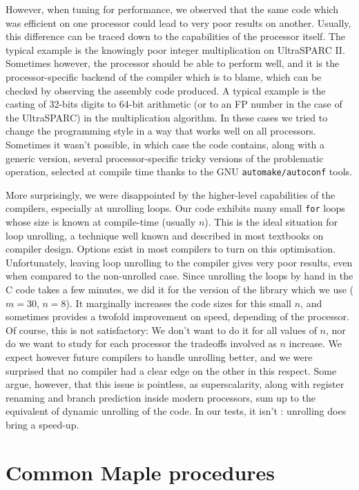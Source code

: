 However, when tuning for performance, we observed that the same code
which was efficient on one processor could lead to very poor results
on another.  Usually, this difference can be traced down to the
capabilities of the processor itself. The typical example is the
knowingly poor integer multiplication on UltraSPARC II. Sometimes
however, the processor should be able to perform well, and it is the
processor-specific backend of the compiler which is to blame, which
can be checked by observing the assembly code produced.  A typical
example is the casting of 32-bits digits to 64-bit arithmetic (or to
an FP number in the case of the UltraSPARC) in the multiplication
algorithm. In these cases we tried to change the programming style in
a way that works well on all processors. Sometimes it wasn't possible,
in which case the code contains, along with a generic version, several
processor-specific tricky versions of the problematic operation,
selected at compile time thanks to the GNU \texttt{automake/autoconf}
tools.


More surprisingly, we were disappointed by the higher-level
capabilities of the compilers, especially at unrolling loops. Our code
exhibits many small \texttt{for} loops whose size is known at
compile-time (usually $n$). This is the ideal situation for loop
unrolling, a technique well known and described in most textbooks on
compiler design. Options exist in most compilers to turn on this
optimisation. Unfortunately, leaving loop unrolling to the compiler
gives very poor results, even when compared to the non-unrolled case.
Since unrolling the loops by hand in the C code takes a few minutes,
we did it for the version of the library which we use ($m=30$, $n=8$).
It marginally increases the code sizes for this small $n$, and
sometimes provides a twofold improvement on speed, depending of the
processor. Of course, this is not satisfactory: We don't want to do it
for all values of $n$, nor do we want to study for each processor the
tradeoffs involved as $n$ increase. We expect however future compilers
to handle unrolling better, and we were surprised that no compiler had
a clear edge on the other in this respect. Some argue, however, that
this issue is pointless, as superscalarity, along with register
renaming and branch prediction inside modern processors, sum up to the
equivalent of dynamic unrolling of the code. In our tests, it isn't :
unrolling does bring a speed-up.






\section{Common Maple procedures \label{section:commonMaple}}


